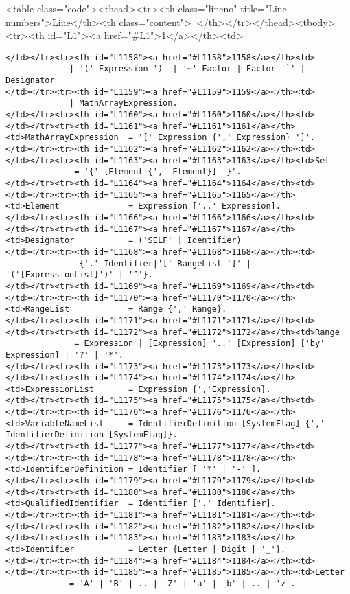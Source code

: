 <table class="code"><thead><tr><th class="lineno" title="Line numbers">Line</th><th class="content"> </th></tr></thead><tbody><tr><th id="L1"><a href="#L1">1</a></th><td>\documentclass[a4paper,11pt]{article}
\begin{document}
\begin{lstlisting}[language = EBNF, frame=none,xleftmargin=0mm]
</td></tr><tr><th id="L1158"><a href="#L1158">1158</a></th><td>                     | '(' Expression ')' | '~' Factor | Factor '`' | Designator
</td></tr><tr><th id="L1159"><a href="#L1159">1159</a></th><td>                     | MathArrayExpression.
</td></tr><tr><th id="L1160"><a href="#L1160">1160</a></th><td>
</td></tr><tr><th id="L1161"><a href="#L1161">1161</a></th><td>MathArrayExpression  = '[' Expression {',' Expression} ']'.
</td></tr><tr><th id="L1162"><a href="#L1162">1162</a></th><td>
</td></tr><tr><th id="L1163"><a href="#L1163">1163</a></th><td>Set                  = '{' [Element {',' Element}] '}'.
</td></tr><tr><th id="L1164"><a href="#L1164">1164</a></th><td>
</td></tr><tr><th id="L1165"><a href="#L1165">1165</a></th><td>Element              = Expression ['..' Expression].
</td></tr><tr><th id="L1166"><a href="#L1166">1166</a></th><td>
</td></tr><tr><th id="L1167"><a href="#L1167">1167</a></th><td>Designator           = ('SELF' | Identifier)
</td></tr><tr><th id="L1168"><a href="#L1168">1168</a></th><td>                       {'.' Identifier|'[' RangeList ']' | '('[ExpressionList]')' | '^'}.
</td></tr><tr><th id="L1169"><a href="#L1169">1169</a></th><td>
</td></tr><tr><th id="L1170"><a href="#L1170">1170</a></th><td>RangeList            = Range {',' Range}.
</td></tr><tr><th id="L1171"><a href="#L1171">1171</a></th><td>
</td></tr><tr><th id="L1172"><a href="#L1172">1172</a></th><td>Range                = Expression | [Expression] '..' [Expression] ['by' Expression] | '?' | '*'.
</td></tr><tr><th id="L1173"><a href="#L1173">1173</a></th><td>
</td></tr><tr><th id="L1174"><a href="#L1174">1174</a></th><td>ExpressionList       = Expression {','Expression}.
</td></tr><tr><th id="L1175"><a href="#L1175">1175</a></th><td>
</td></tr><tr><th id="L1176"><a href="#L1176">1176</a></th><td>VariableNameList     = IdentifierDefinition [SystemFlag] {',' IdentifierDefinition [SystemFlag]}.
</td></tr><tr><th id="L1177"><a href="#L1177">1177</a></th><td>
</td></tr><tr><th id="L1178"><a href="#L1178">1178</a></th><td>IdentifierDefinition = Identifier [ '*' | '-' ].
</td></tr><tr><th id="L1179"><a href="#L1179">1179</a></th><td>
</td></tr><tr><th id="L1180"><a href="#L1180">1180</a></th><td>QualifiedIdentifier  = Identifier ['.' Identifier].
</td></tr><tr><th id="L1181"><a href="#L1181">1181</a></th><td>
</td></tr><tr><th id="L1182"><a href="#L1182">1182</a></th><td>
</td></tr><tr><th id="L1183"><a href="#L1183">1183</a></th><td>Identifier           = Letter {Letter | Digit | '_'}.
</td></tr><tr><th id="L1184"><a href="#L1184">1184</a></th><td>
</td></tr><tr><th id="L1185"><a href="#L1185">1185</a></th><td>Letter               = 'A' | 'B' | .. | 'Z' | 'a' | 'b' | .. | 'z'.

\end{lstlisting}
\end{document}
